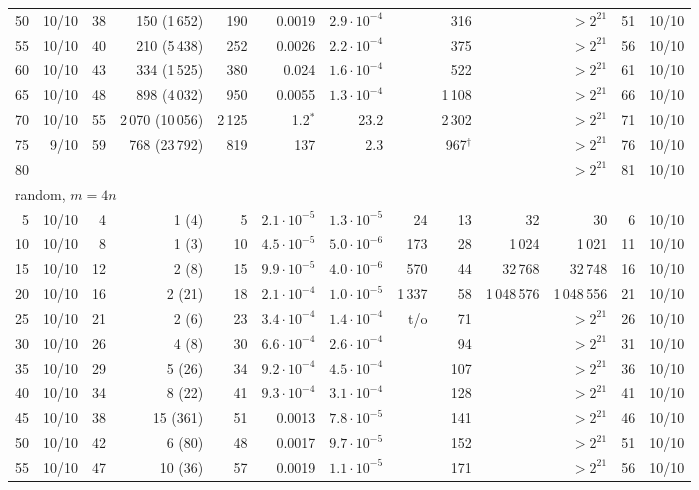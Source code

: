 \begin{table}[p]
\begin{tabular}{r r r r r r r r r r r r r}
50 & 10/10 & 38 & 150 (1\,652) & 190 & 0.0019 & $2.9{\cdot}10^{-4}$ &  & 316 &  & $>2^{21}$ & 51 & 10/10\\
55 & 10/10 & 40 & 210 (5\,438) & 252 & 0.0026 & $2.2{\cdot}10^{-4}$ &  & 375 &  & $>2^{21}$ & 56 & 10/10\\
60 & 10/10 & 43 & 334 (1\,525) & 380 & 0.024 & $1.6{\cdot}10^{-4}$ &  & 522 &  & $>2^{21}$ & 61 & 10/10\\
65 & 10/10 & 48 & 898 (4\,032) & 950 & 0.0055 & $1.3{\cdot}10^{-4}$ &  & 1\,108 &  & $>2^{21}$ & 66 & 10/10\\
70 & 10/10 & 55 & 2\,070 (10\,056) & 2\,125 & 1.2$^{*}$ & 23.2 &  & 2\,302 &  & $>2^{21}$ & 71 & 10/10\\
75 & 9/10 & 59 & 768 (23\,792) & 819 & 137 & 2.3 &  & 967$^{\dagger}$ &  & $>2^{21}$ & 76 & 10/10\\
80 &  &  &  &  &  &  &  &  &  & $>2^{21}$ & 81 & 10/10\\
\midrule
\multicolumn{13}{l}{random, $m=4n$}\\
5 & 10/10 & 4 & 1 (4) & 5 & $2.1{\cdot}10^{-5}$ & $1.3{\cdot}10^{-5}$ & 24 & 13 & 32 & 30 & 6 & 10/10\\
10 & 10/10 & 8 & 1 (3) & 10 & $4.5{\cdot}10^{-5}$ & $5.0{\cdot}10^{-6}$ & 173 & 28 & 1\,024 & 1\,021 & 11 & 10/10\\
15 & 10/10 & 12 & 2 (8) & 15 & $9.9{\cdot}10^{-5}$ & $4.0{\cdot}10^{-6}$ & 570 & 44 & 32\,768 & 32\,748 & 16 & 10/10\\
20 & 10/10 & 16 & 2 (21) & 18 & $2.1{\cdot}10^{-4}$ & $1.0{\cdot}10^{-5}$ & 1\,337 & 58 & 1\,048\,576 & 1\,048\,556 & 21 & 10/10\\
25 & 10/10 & 21 & 2 (6) & 23 & $3.4{\cdot}10^{-4}$ & $1.4{\cdot}10^{-4}$ & t/o & 71 &  & $>2^{21}$ & 26 & 10/10\\
30 & 10/10 & 26 & 4 (8) & 30 & $6.6{\cdot}10^{-4}$ & $2.6{\cdot}10^{-4}$ &  & 94 &  & $>2^{21}$ & 31 & 10/10\\
35 & 10/10 & 29 & 5 (26) & 34 & $9.2{\cdot}10^{-4}$ & $4.5{\cdot}10^{-4}$ &  & 107 &  & $>2^{21}$ & 36 & 10/10\\
40 & 10/10 & 34 & 8 (22) & 41 & $9.3{\cdot}10^{-4}$ & $3.1{\cdot}10^{-4}$ &  & 128 &  & $>2^{21}$ & 41 & 10/10\\
45 & 10/10 & 38 & 15 (361) & 51 & 0.0013 & $7.8{\cdot}10^{-5}$ &  & 141 &  & $>2^{21}$ & 46 & 10/10\\
50 & 10/10 & 42 & 6 (80) & 48 & 0.0017 & $9.7{\cdot}10^{-5}$ &  & 152 &  & $>2^{21}$ & 51 & 10/10\\
55 & 10/10 & 47 & 10 (36) & 57 & 0.0019 & $1.1{\cdot}10^{-5}$ &  & 171 &  & $>2^{21}$ & 56 & 10/10\\

\end{tabular}
\end{table}
